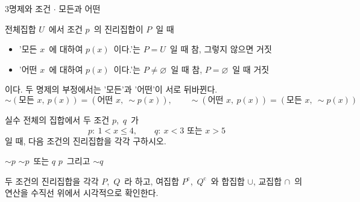 \documentclass[10pt]{article}
\begin{document}
\begin{dmconcept}{3}{명제와 조건 $\cdot$ 모든과 어떤}

전체집합 $U$\ 에서 조건 $p$\ 의 진리집합이 $P$\ 일 때
\begin{itemize}[leftmargin=8mm, itemsep=0.4mm, topsep=0.8mm]
  \item '모든 $x$\ 에 대하여 $p(x)$\ 이다.'는 $P = U$\ 일 때 참, 그렇지 않으면 거짓
  \item '어떤 $x$\ 에 대하여 $p(x)$\ 이다.'는 $P \ne \varnothing$\ 일 때 참, $P = \varnothing$\ 일 때 거짓
\end{itemize}
이다. 두 명제의 부정에서는 '모든'과 '어떤'이 서로 뒤바뀐다.
\begin{equation*}
  \sim (\text{모든 } x,\ p(x)) = (\text{어떤 } x,\ \sim p(x)), \qquad \sim (\text{어떤 } x,\ p(x)) = (\text{모든 } x,\ \sim p(x))
\end{equation*}

\end{dmconcept}

\newpage


\begin{dmproblem}
실수 전체의 집합에서 두 조건 $p$,\ $q$\ 가
\begin{equation*}
  p:\ 1 < x \le 4, \qquad q:\ x < 3 \text{ 또는 } x > 5
\end{equation*}
일 때, 다음 조건의 진리집합을 각각 구하시오.

\vspace{3mm}
\noindent{} $\sim p$\hfill{} $\sim p$\ 또는 $q$\hfill{} $p$\ 그리고 $\sim q$\hfill\null
\end{dmproblem}

\begin{dmapproach}
두 조건의 진리집합을 각각 $P$,\ $Q$\ 라 하고, 여집합 $P^\mathrm{c}$,\ $Q^\mathrm{c}$\ 와 합집합 $\cup$, 교집합 $\cap$\ 의 연산을 수직선 위에서 시각적으로 확인한다.
\end{dmapproach}
\end{document}
